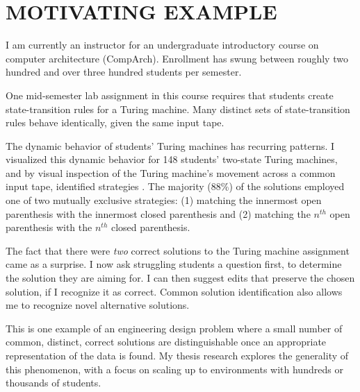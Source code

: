 \documentclass[12pt]{article}
\begin{document}
\section{MOTIVATING EXAMPLE}
I am currently an instructor for an undergraduate introductory course on computer architecture (CompArch). Enrollment has swung between roughly two hundred and over three hundred students per semester. 

One mid-semester lab assignment in this course requires that students create state-transition rules for a Turing machine. %
Many distinct sets of state-transition rules behave identically, given the same input tape. %

The dynamic behavior of students' Turing machines has recurring patterns. I visualized this dynamic behavior for 148 students' two-state Turing machines, and by visual inspection of the Turing machine's movement across a common input tape, identified strategies \cite{ICERGlassman}. The majority (88\%) of the solutions employed one of two mutually exclusive strategies: (1) matching the innermost open parenthesis with the innermost closed parenthesis and (2) matching the $n^{th}$ open parenthesis with the $n^{th}$ closed parenthesis.

The fact that there were {\em two} correct solutions to the Turing machine assignment came as a surprise. I now ask struggling students a question first, to determine the solution they are aiming for. I can then suggest edits that preserve the chosen solution, if I recognize it as correct. Common solution identification also allows me to recognize novel alternative solutions.


This is one example of an engineering design problem where a small number of common, distinct, correct solutions are distinguishable once an appropriate representation of the data is found. My thesis research explores the generality of this phenomenon, with a focus on scaling up to environments with hundreds or thousands of students.
\end{document}
